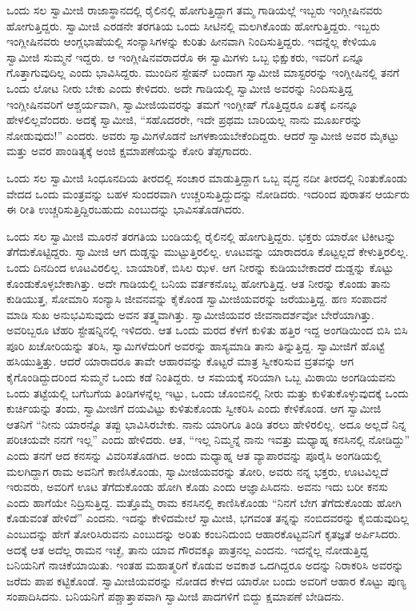  ಒಂದು ಸಲ ಸ್ವಾಮೀಜಿ ರಾಜಾಸ್ಥಾನದಲ್ಲಿ ರೈಲಿನಲ್ಲಿ ಹೋಗುತ್ತಿದ್ದಾಗ ತಮ್ಮ ಗಾಡಿಯಲ್ಲೆ ಇಬ್ಬರು ಇಂಗ್ಲೀಷಿನವರು ಹೋಗುತ್ತಿದ್ದರು. ಸ್ವಾಮೀಜಿ ಎರಡನೇ ತರಗತಿಯ ಒಂದು ಸೀಟಿನಲ್ಲಿ ಮಲಗಿಕೊಂಡು ಹೋಗುತ್ತಿದ್ದರು. ಇಬ್ಬರು ಇಂಗ್ಲೀಷಿನವರು ಆಂಗ್ಲಭಾಷೆಯಲ್ಲಿ ಸಂನ್ಯಾಸಿಗಳನ್ನು ಕುರಿತು ಹೀನವಾಗಿ ನಿಂದಿಸುತ್ತಿದ್ದರು. ಇದನ್ನೆಲ್ಲ ಕೇಳಿಯೂ ಸ್ವಾಮೀಜಿ ಸುಮ್ಮನೆ ಇದ್ದರು. ಆ ಇಂಗ್ಲೀಷಿನವರಾದರೊ ಈ ಸ್ವಾಮಿಗಳು ಒಬ್ಬ ಭಿಕ್ಷುಕರು, ಇವರಿಗೆ ಏನ್ನೂ ಗೊತ್ತಾಗುವುದಿಲ್ಲ ಎಂದು ಭಾವಿಸಿದ್ದರು. ಮುಂದಿನ ಸ್ಟೇಷನ್ ಬಂದಾಗ ಸ್ವಾಮೀಜಿ ಮಾಸ್ಟರರನ್ನು ಇಂಗ್ಲೀಷಿನಲ್ಲಿ ತನಗೆ ಒಂದು ಲೋಟ ನೀರು ಬೇಕು ಎಂದು ಕೇಳಿದರು. ಅದೇ ಗಾಡಿಯಲ್ಲಿ ಸ್ವಾಮೀಜಿ ಅವರನ್ನು ನಿಂದಿಸುತ್ತಿದ್ದ ಇಂಗ್ಲೀಷಿನವರಿಗೆ ಆಶ್ಚರ್ಯವಾಗಿ, ಸ್ವಾಮೀಜಿಯವರನ್ನು ತಮಗೆ ಇಂಗ್ಲೀಷ್ ಗೊತ್ತಿದ್ದರೂ ಏತಕ್ಕೆ ಏನನ್ನೂ ಹೇಳಲಿಲ್ಲವೆಂದರು. ಅದಕ್ಕೆ ಸ್ವಾಮೀಜಿ, “ಸಹೊದರರೇ, ಇದೇ ಪ್ರಥಮ ಬಾರಿಯಲ್ಲ ನಾನು ಮೂರ್ಖರನ್ನು ನೋಡುವುದು!” ಎಂದರು. ಅವರು ಸ್ವಾಮಿಗಳೊಡನೆ ಜಗಳಕಾಯಬೇಕೆಂದಿದ್ದರು. ಆದರೆ ಸ್ವಾಮೀಜಿ ಅವರ ಮೈಕಟ್ಟು ಮತ್ತು ಅವರ ಪಾಂಡಿತ್ಯಕ್ಕೆ ಅಂಜಿ ಕ್ಷಮಾಪಣೆಯನ್ನು ಕೋರಿ ತೆಪ್ಪಗಾದರು. 

 ಒಂದು ಸಲ ಸ್ವಾಮೀಜಿ ಸಿಂಧೂನದಿಯ ತೀರದಲ್ಲಿ ಸಂಚಾರ ಮಾಡುತ್ತಿದ್ದಾಗ ಒಬ್ಬ ವೃದ್ಧ ನದೀ ತೀರದಲ್ಲಿ ನಿಂತುಕೊಂಡು ವೇದದ ಒಂದು ಮಂತ್ರವನ್ನು ಬಹಳ ಸುಂದರವಾಗಿ ಉಚ್ಚರಿಸುತ್ತಿದ್ದುದನ್ನು ನೋಡಿದರು. ಇದರಿಂದ ಪುರಾತನ ಆರ್ಯರು ಈ ರೀತಿ ಉಚ್ಚರಿಸುತ್ತಿದ್ದಿರಬಹುದು ಎಂಬುದನ್ನು ಭಾವಿಸತೊಡಗಿದರು. 

 ಒಂದು ಸಲ ಸ್ವಾಮೀಜಿ ಮೂರನೆ ತರಗತಿಯ ಬಂಡಿಯಲ್ಲಿ ರೈಲಿನಲ್ಲಿ ಹೋಗುತ್ತಿದ್ದರು. ಭಕ್ತರು ಯಾರೋ ಟಿಕೀಟನ್ನು ತೆಗೆದುಕೊಟ್ಟಿದ್ದರು. ಸ್ವಾಮೀಜಿ ಆಗ ದುಡ್ಡನ್ನು ಮುಟ್ಟುತ್ತಿರಲಿಲ್ಲ. ಊಟವನ್ನು ಯಾರಾದರೂ ಕೊಟ್ಟಲ್ಲದೆ ಕೇಳುತ್ತಿರಲಿಲ್ಲ. ಒಂದು ದಿನದಿಂದ ಊಟವಿರಲಿಲ್ಲ. ಬಾಯಾರಿಕೆ, ಬಿಸಿಲ ಝಳ. ಆಗ ನೀರನ್ನು ಕುಡಿಯಬೇಕಾದರೆ ದುಡ್ಡನ್ನು ಕೊಟ್ಟು ಕೊಂಡುಕೊಳ್ಳಬೇಕಾಗಿತ್ತು. ಅದೇ ಗಾಡಿಯಲ್ಲಿ ಬನಿಯ ವರ್ತಕನೊಬ್ಬ ಹೋಗುತ್ತಿದ್ದ. ಆತ ನೀರನ್ನು ಕೊಂಡು ತಾನು ಕುಡಿಯುತ್ತ, ಸೋಮಾರಿ ಸಂನ್ಯಾಸಿ ಜೀವನವನ್ನು ಕೈಕೊಂಡ ಸ್ವಾಮೀಜಿಯವರನ್ನು ಜರೆಯುತ್ತಿದ್ದ. ಹಣ ಸಂಪಾದನೆ ಮಾಡಿ ಸುಖ ಅನುಭವಿಸುವುದು ಅವನ ತತ್ತ್ವವಾಗಿತ್ತು. ಸ್ವಾಮೀಜಿಯವರ ಜೀವನಾದರ್ಶವೋ ಬೇರೆಯಾಗಿತ್ತು. ಅವರಿಬ್ಬರೂ ಟೆಹರಿ ಸ್ಟೇಷನ್ನಿನಲ್ಲಿ ಇಳಿದರು. ಆತ ಒಂದು ಮರದ ಕೆಳಗೆ ಕುಳಿತು ಹತ್ತಿರ ಇದ್ದ ಅಂಗಡಿಯಿಂದ ಬಿಸಿ ಬಿಸಿ ಪೂರಿ ಖಚೋರಿಯನ್ನು ತರಿಸಿ, ಸ್ವಾಮಿಗಳೆದುರಿಗೆ ಅವರನ್ನು ಹಾಸ್ಯಮಾಡಿ ತಾನು ತಿನ್ನುತ್ತಿದ್ದ. ಸ್ವಾಮೀಜಿಗೆ ಹೊಟ್ಟೆ ಹಸಿಯುತ್ತಿತ್ತು. ಆದರೆ ಯಾರಾದರೂ ತಾವೇ ಆಹಾರವನ್ನು ಕೊಟ್ಟರೆ ಮಾತ್ರ ಸ್ವೀಕರಿಸುವ ವ್ರತವನ್ನು ಆಗ ಕೈಗೊಂಡಿದ್ದುದರಿಂದ ಸುಮ್ಮನೆ ಒಂದು ಕಡೆ ನಿಂತಿದ್ದರು. ಆ ಸಮಯಕ್ಕೆ ಸರಿಯಾಗಿ ಒಬ್ಬ ಮಿಠಾಯಿ ಅಂಗಡಿಯವನು ಒಂದು ತಟ್ಟೆಯಲ್ಲಿ ಬಗೆಬಗೆಯ ತಿಂಡಿಗಳನ್ನೆಲ್ಲ ಇಟ್ಟು, ಒಂದು ಚೊಂಬಿನಲ್ಲಿ ನೀರು ಮತ್ತು ಕುಳಿತುಕೊಳ್ಳುವುದಕ್ಕೆ ಒಂದು ಕುರ್ಚಿಯನ್ನು ತಂದು, ಸ್ವಾಮೀಜಿಗೆ ದಯವಿಟ್ಟು ಕುಳಿತುಕೊಂಡು ಸ್ವೀಕರಿಸಿ ಎಂದು ಕೇಳಿಕೊಂಡ. ಆಗ ಸ್ವಾಮೀಜಿ ಆತನಿಗೆ “ನೀನು ಯಾರನ್ನೊ ತಪ್ಪು ಭಾವಿಸಿರಬೇಕು. ನಾನು ಯಾರಿಗೂ ತಿಂಡಿ ತರಲು ಹೇಳಿರಲಿಲ್ಲ. ಅದೂ ಅಲ್ಲದೆ ನಿನ್ನ ಪರಿಚಯವೇ ನನಗೆ ಇಲ್ಲ” ಎಂದು ಹೇಳಿದರು. ಆತ, “ಇಲ್ಲ ನಿಮ್ಮನ್ನೆ ನಾನು ಇವತ್ತು ಮಧ್ಯಾಹ್ನ ಕನಸಿನಲ್ಲಿ ನೋಡಿದ್ದು” ಎಂದು ತನಗೆ ಆದ ಕನಸನ್ನು ವಿವರಿಸತೊಡಗಿದ. ಅಂದು ಮಧ್ಯಾಹ್ನ ಆತ ವ್ಯಾಪಾರವನ್ನು ಪೂರೈಸಿ ಅಂಗಡಿಯಲ್ಲಿ ಮಲಗಿದ್ದಾಗ ರಾಮ ಅವನಿಗೆ ಕಾಣಿಸಿಕೊಂಡು, ಸ್ವಾಮೀಜಿಯವರನ್ನು ತೋರಿ, ಅವರು ನನ್ನ ಭಕ್ತರು, ಊಟವಿಲ್ಲದೆ ಇರುವರು, ಅವರಿಗೆ ಊಟ ತೆಗೆದುಕೊಂಡು ಹೋಗಿ ಕೊಡು ಎಂದು ಆಜ್ಞಾಪಿಸಿದನು. ಅವನು ಇದು ಬರೀ ಕನಸು ಎಂದು ಹಾಗೆಯೇ ನಿದ್ರಿಸುತ್ತಿದ್ದ. ಮತ್ತೊಮ್ಮೆ ರಾಮ ಕನಸಿನಲ್ಲಿ ಕಾಣಿಸಿಕೊಂಡು “ನಿನಗೆ ಬೇಗ ತೆಗೆದುಕೊಂಡು ಹೋಗಿ ಕೊಡುವಂತೆ ಹೇಳಿದೆ” ಎಂದನು. ಇದನ್ನು ಕೇಳಿದಮೇಲೆ ಸ್ವಾಮೀಜಿ, ಭಗವಂತ ತನ್ನನ್ನು ನಂಬಿದವರನ್ನು ಕೈಬಿಡುವುದಿಲ್ಲ ಎಂಬುದನ್ನು ಹೇಗೆ ತೋರಿಸಿರುವನು ಎಂಬುದನ್ನು ಅರಿತು ಕಂಬನಿದುಂಬಿ ಆಹಾರಕೊಟ್ಟವನಿಗೆ ಕೃತಜ್ಞತೆ ಅರ್ಪಿಸಿದರು. ಅದಕ್ಕೆ ಆತ ಅದೆಲ್ಲ ರಾಮನ ಇಚ್ಛೆ, ತಾನು ಯಾವ ಗೌರವಕ್ಕೂ ಪಾತ್ರನಲ್ಲ ಎಂದನು. ಇದನ್ನೆಲ್ಲ ನೋಡುತ್ತಿದ್ದ ಬನಿಯನಿಗೆ ನಾಚಿಕೆಯಾಯಿತು. ಇಂತಹ ಮಹಾತ್ಮರಿಗೆ ಕೊಡುವ ಅವಕಾಶ ಒದಗಿದ್ದರೂ ಅದನ್ನು ನಿರಾಕರಿಸಿ ಅವರನ್ನು ಜರೆದು ಪಾಪ ಕಟ್ಟಿಕೊಂಡೆ. ಸ್ವಾಮೀಜಿಯವರನ್ನು ನೋಡದ ಕೇಳದ ಯಾರೋ ಬಂದು ಅವರಿಗೆ ಆಹಾರ ಕೊಟ್ಟು ಪುಣ್ಯ ಸಂಪಾದಿಸಿದನು. ಬನಿಯನಿಗೆ ಪಶ್ಚಾತ್ತಾಪವಾಗಿ ಸ್ವಾಮೀಜಿ ಪಾದಗಳಿಗೆ ಬಿದ್ದು ಕ್ಷಮಾಪಣೆ ಬೇಡಿದನು. 

